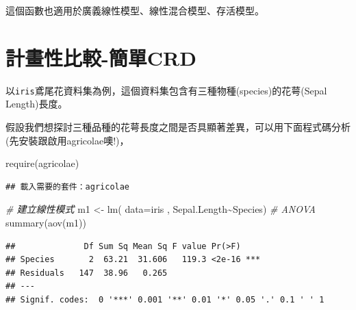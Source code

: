 \documentclass[
]{book}
\newenvironment{Shaded}{\begin{snugshade}}{\end{snugshade}}
\newcommand{\AttributeTok}[1]{\textcolor[rgb]{0.77,0.63,0.00}{#1}}
\newcommand{\CommentTok}[1]{\textcolor[rgb]{0.56,0.35,0.01}{\textit{#1}}}
\newcommand{\FunctionTok}[1]{\textcolor[rgb]{0.00,0.00,0.00}{#1}}
\newcommand{\NormalTok}[1]{#1}
\newcommand{\OtherTok}[1]{\textcolor[rgb]{0.56,0.35,0.01}{#1}}
\newcommand{\SpecialCharTok}[1]{\textcolor[rgb]{0.00,0.00,0.00}{#1}}
\newcommand{\StringTok}[1]{\textcolor[rgb]{0.31,0.60,0.02}{#1}}
\begin{document}
這個函數也適用於廣義線性模型、線性混合模型、存活模型。

\hypertarget{ux8a08ux756bux6027ux6bd4ux8f03-ux7c21ux55aecrd}{%
\section{計畫性比較-簡單CRD}\label{ux8a08ux756bux6027ux6bd4ux8f03-ux7c21ux55aecrd}}

以\texttt{iris}鳶尾花資料集為例，這個資料集包含有三種物種(species)的花萼(Sepal Length)長度。

假設我們想探討三種品種的花萼長度之間是否具顯著差異，可以用下面程式碼分析 (先安裝跟啟用agricolae噢!)，

\begin{Shaded}
\begin{Highlighting}[]
\FunctionTok{require}\NormalTok{(agricolae)}
\end{Highlighting}
\end{Shaded}

\begin{verbatim}
## 載入需要的套件：agricolae
\end{verbatim}

\begin{Shaded}
\begin{Highlighting}[]
\CommentTok{\# 建立線性模式}
\NormalTok{m1 }\OtherTok{\textless{}{-}} \FunctionTok{lm}\NormalTok{( }\AttributeTok{data=}\NormalTok{iris , Sepal.Length}\SpecialCharTok{\textasciitilde{}}\NormalTok{Species)}
\CommentTok{\# ANOVA}
\FunctionTok{summary}\NormalTok{(}\FunctionTok{aov}\NormalTok{(m1))}
\end{Highlighting}
\end{Shaded}

\begin{verbatim}
##              Df Sum Sq Mean Sq F value Pr(>F)    
## Species       2  63.21  31.606   119.3 <2e-16 ***
## Residuals   147  38.96   0.265                   
## ---
## Signif. codes:  0 '***' 0.001 '**' 0.01 '*' 0.05 '.' 0.1 ' ' 1
\end{verbatim}

\begin{Shaded}
\end{Shaded}
\end{document}
